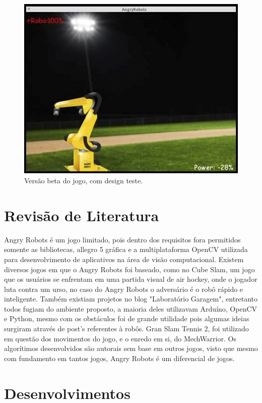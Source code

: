 \documentclass{sciposter}
\begin{document}
\begin{multicols}{3}
\begin{figure}[!htb]
\centering
\includegraphics[scale=1.4]{betateste.jpg}
\caption{Versão beta do jogo, com design teste.}
\end{figure}

\vspace{0.7cm}

\newcommand{\imsize}{0.45\columnwidth}

\section{Revisão de Literatura}
Angry Robots é um jogo limitado, pois dentro dos requisitos fora permitidos somente as bibliotecas, allegro 5 gráfica e a multiplataforma OpenCV utilizada para desenvolvimento de aplicativos na área de visão computacional.
Existem diversos jogos em que o Angry Robots foi baseado, como no Cube Slam, um jogo que os usuários se enfrentam em uma partida visual de air hockey, onde o jogador luta contra um urso, no caso do Angry Robots o adversário é o robô rápido e inteligente. Também existiam projetos no blog "Laboratório Garagem", entretanto todos fugiam do ambiente proposto, a maioria deles utilizavam Arduíno, OpenCV e Python, mesmo com os obstáculos foi de grande utilidade pois algumas ideias surgiram através de post's referentes à robôs. Gran Slam Tennis 2, foi utilizado em questão dos movimentos do jogo, e o enredo em si, do MechWarrior. Os algorítimos desenvolvidos são autorais sem base em outros jogos, visto que mesmo com fundamento em tantos jogos, Angry Robots é um diferencial de jogos.

\section{Desenvolvimentos}


\end{multicols}
\end{document}

